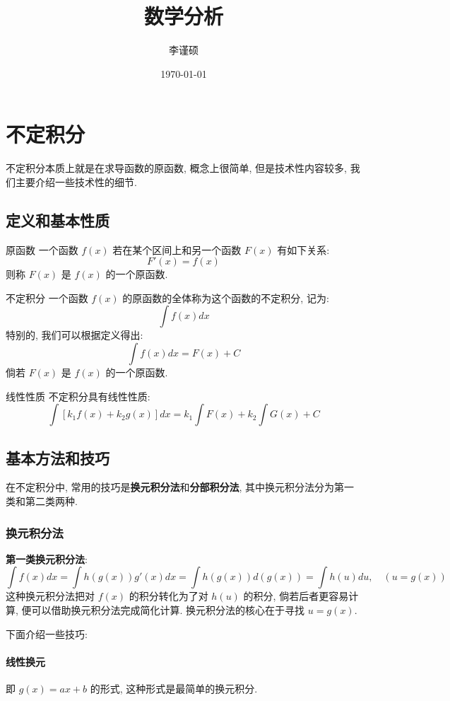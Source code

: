\documentclass[a4paper,12pt]{ctexart}
\title{\bfseries 数学分析}
\author{李谨硕}
\date{\today}
\begin{document}
\maketitle
\tableofcontents
\newpage

\section{不定积分}
不定积分本质上就是在求导函数的原函数, 概念上很简单, 但是技术性内容较多, 我们主要介绍一些技术性的细节.

\subsection{定义和基本性质}

\begin{mydef}{原函数}{}
一个函数 $f(x)$ 若在某个区间上和另一个函数 $F(x)$ 有如下关系: 
$$
F'(x) = f(x)
$$
则称 $F(x)$ 是 $f(x)$ 的一个原函数.
\end{mydef}

\begin{mydef}{不定积分}{}
一个函数 $f(x)$ 的原函数的全体称为这个函数的不定积分, 记为: 
$$
\int f(x) dx
$$
特别的, 我们可以根据定义得出: 
$$
\int f(x) dx = F(x) + C
$$
倘若 $F(x)$ 是 $f(x)$ 的一个原函数.
\end{mydef}

\begin{myprop}{线性性质}{}
不定积分具有线性性质:
$$
\int [k_1f(x)+k_2g(x)]dx = k_1\int F(x) +k_2\int G(x) +C
$$
\end{myprop}

\subsection{基本方法和技巧}
在不定积分中, 常用的技巧是\textbf{换元积分法}和\textbf{分部积分法}, 其中换元积分法分为第一类和第二类两种.

\subsubsection{换元积分法}

\textbf{第一类换元积分法}:
$$
\int f(x) dx = \int h(g(x))g'(x)dx = \int h(g(x))d(g(x)) = \int h(u) du, \quad (u = g(x))
$$
这种换元积分法把对 $f(x)$ 的积分转化为了对 $h(u)$ 的积分, 倘若后者更容易计算, 便可以借助换元积分法完成简化计算. 换元积分法的核心在于寻找 $u = g(x)$.

下面介绍一些技巧:

\paragraph{线性换元} 即 $g(x) = ax+b$ 的形式, 这种形式是最简单的换元积分.
\end{document}

